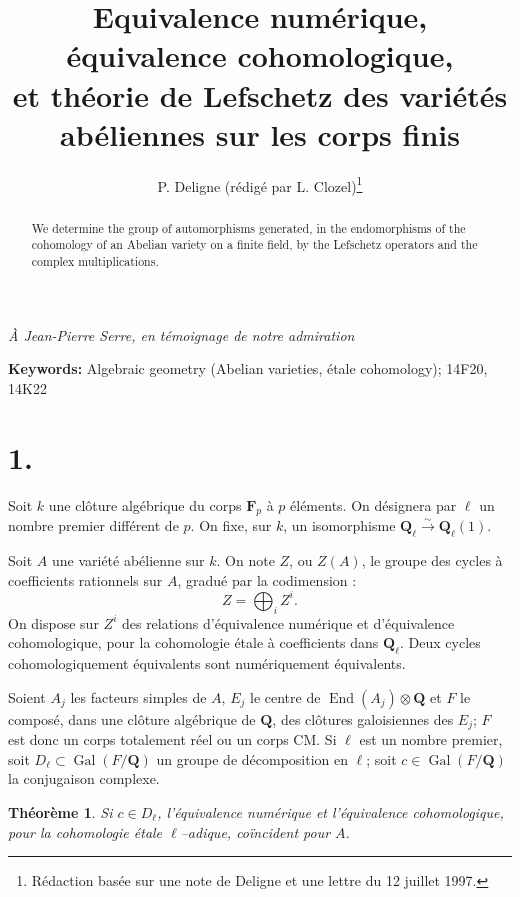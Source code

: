 \documentclass[11pt,a4paper]{article}
\title{\textbf{Equivalence num\'erique, \'equivalence cohomologique,\\
et th\'eorie de Lefschetz des vari\'et\'es ab\'eliennes sur les corps finis}}
\author{P. Deligne (r\'edig\'e par L. Clozel)\thanks{R\'edaction bas\'ee sur une note de Deligne et une lettre du 12 juillet 1997.}}
\date{}
\theoremstyle{plain}
\newtheorem{theorem}{Th\'eor\`eme}
\theoremstyle{definition}
\DeclareMathOperator{\Gal}{Gal}
\DeclareMathOperator{\End}{End}
\begin{document}
\maketitle

\begin{center}
\textit{\`A Jean-Pierre Serre, en t\'emoignage de notre admiration}
\end{center}

\begin{abstract}\noindent
We determine the group of automorphisms generated, in the endomorphisms of the cohomology of an Abelian variety on a finite field, by the Lefschetz operators and the complex multiplications.
\end{abstract}

\noindent\textbf{Keywords:} Algebraic geometry (Abelian varieties, \'etale cohomology); 14F20, 14K22

\section*{1.}

Soit $k$ une cl\^oture alg\'ebrique du corps $\mathbf{F}_p$ \`a $p$ \'el\'ements. On d\'esignera par $\ell$ un nombre premier diff\'erent de $p$. On fixe, sur $k$, un isomorphisme $\mathbf{Q}_\ell \xrightarrow{\sim} \mathbf{Q}_\ell(1)$.

Soit $A$ une vari\'et\'e ab\'elienne sur $k$. On note $Z$, ou $Z(A)$, le groupe des cycles \`a coefficients rationnels sur $A$, gradu\'e par la codimension :
\[
Z = \bigoplus_i Z^i .
\]
On dispose sur $Z^i$ des relations d'\'equivalence num\'erique et d'\'equivalence cohomologique, pour la cohomologie \'etale \`a coefficients dans $\mathbf{Q}_\ell$. Deux cycles cohomologiquement \'equivalents sont num\'eriquement \'equivalents.

Soient $A_j$ les facteurs simples de $A$, $E_j$ le centre de $\End(A_j) \otimes \mathbf{Q}$ et $F$ le compos\'e, dans une cl\^oture alg\'ebrique de $\mathbf{Q}$, des cl\^otures galoisiennes des $E_j$; $F$ est donc un corps totalement r\'eel ou un corps CM. Si $\ell$ est un nombre premier, soit $D_\ell \subset \Gal(F/\mathbf{Q})$ un groupe de d\'ecomposition en $\ell$; soit $c \in \Gal(F/\mathbf{Q})$ la conjugaison complexe.

\begin{theorem}
Si $c \in D_\ell$, l'\'equivalence num\'erique et l'\'equivalence cohomologique, pour la cohomologie \'etale $\ell$--adique, co\"incident pour $A$.
\end{theorem}
\end{document}
